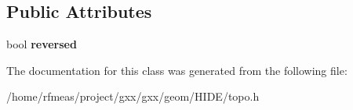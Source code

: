 \subsection*{Public Attributes}
\begin{DoxyCompactItemize}
\item 
bool {\bfseries reversed}\hypertarget{classgxx_1_1topo_1_1wire_aab646b0d6459619ef5ef2423bde539d5}{}\label{classgxx_1_1topo_1_1wire_aab646b0d6459619ef5ef2423bde539d5}

\end{DoxyCompactItemize}


The documentation for this class was generated from the following file\+:\begin{DoxyCompactItemize}
\item 
/home/rfmeas/project/gxx/gxx/geom/\+H\+I\+D\+E/topo.\+h\end{DoxyCompactItemize}

